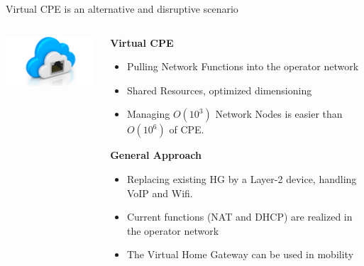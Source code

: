 \documentclass[a4paper]{beamer}
\begin{document}
\begin{frame}{Virtual CPE is an alternative and disruptive scenario}
						
	\begin{columns}[T]
		\begin{column}[T]{0.33 \textwidth} 
			\vspace{2.2cm}
			\includegraphics[width=12em]{vhg.png}
		\end{column}
										
		\begin{column}[T]{0.66\textwidth} 
										   
			\textbf{ Virtual CPE}
			\begin{itemize}
				\item Pulling Network Functions into the operator network
				\item Shared Resources, optimized dimensioning
				\item Managing $O(10^{3})$ Network Nodes is easier than $O(10^{6})$ of CPE.
			\end{itemize}
			\vspace{3mm}
			\textbf{General Approach}
			\begin{itemize}
				\item Replacing existing HG by a Layer-2 device, handling VoIP and Wifi.
				\item Current functions (NAT and DHCP) are realized in the operator network
				\item The Virtual Home Gateway can be used in mobility 
			\end{itemize}
										
																																						
		\end{column}
																										
	\end{columns}
										
\end{frame}
\end{document}
